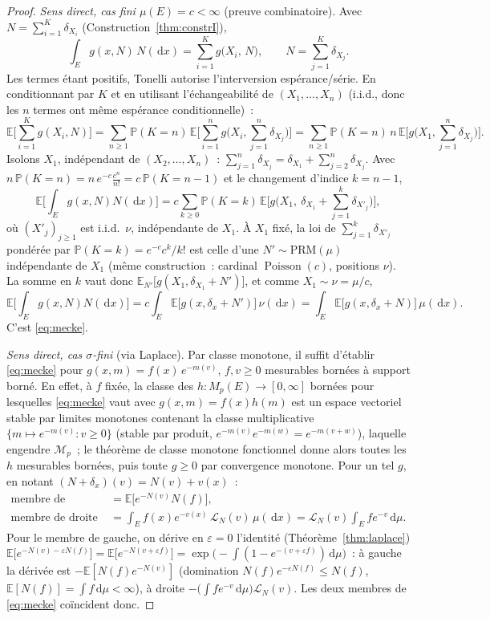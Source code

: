\documentclass[11pt,a4paper]{article}
\theoremstyle{plain}
\theoremstyle{definition}
\newcommand{\E}{\mathbb{E}}
\newcommand{\PP}{\mathbb{P}}
\newcommand{\Poi}{\operatorname{Poisson}}
\newcommand{\Mp}{M_p}
\newcommand{\dd}{\,\mathrm{d}}
\newcommand{\eps}{\varepsilon}
\newcommand{\calM}{\mathcal{M}}
\newcommand{\calL}{\mathcal{L}}
\begin{document}
\begin{proof}
\emph{Sens direct, cas fini $\mu(E)=c<\infty$} (preuve combinatoire). Avec $N=\sum_{i=1}^K\delta_{X_i}$ (Construction~\ref{thm:constrI}),
\[
\int_E g(x,N)\,N(\dd x)=\sum_{i=1}^K g\big(X_i,\,N\big),\qquad N=\sum_{j=1}^K\delta_{X_j}.
\]
Les termes étant positifs, Tonelli autorise l'interversion espérance/série. En conditionnant par $K$ et en utilisant l'échangeabilité de $(X_1,\dots,X_n)$ (i.i.d., donc les $n$ termes ont même espérance conditionnelle)~:
\[
\E\Big[\sum_{i=1}^K g(X_i,N)\Big]
=\sum_{n\ge1}\PP(K=n)\,\E\Big[\sum_{i=1}^n g\big(X_i,\textstyle\sum_{j=1}^n\delta_{X_j}\big)\Big]
=\sum_{n\ge1}\PP(K=n)\,n\,\E\Big[g\big(X_1,\textstyle\sum_{j=1}^n\delta_{X_j}\big)\Big].
\]
Isolons $X_1$, indépendant de $(X_2,\dots,X_n)$~: $\sum_{j=1}^n\delta_{X_j}=\delta_{X_1}+\sum_{j=2}^n\delta_{X_j}$. Avec $n\,\PP(K=n)=n\,e^{-c}\frac{c^n}{n!}=c\,\PP(K=n-1)$ et le changement d'indice $k=n-1$,
\[
\E\Big[\int_E g(x,N)N(\dd x)\Big]
=c\sum_{k\ge0}\PP(K=k)\,\E\Big[g\big(X_1,\ \delta_{X_1}+\textstyle\sum_{j=1}^{k}\delta_{X'_j}\big)\Big],
\]
où $(X'_j)_{j\ge1}$ est i.i.d.\ $\nu$, indépendante de $X_1$. À $X_1$ fixé, la loi de $\sum_{j=1}^{k}\delta_{X'_j}$ pondérée par $\PP(K=k)=e^{-c}c^k/k!$ est celle d'une $N'\sim\mathrm{PRM}(\mu)$ indépendante de $X_1$ (même construction~: cardinal $\Poi(c)$, positions $\nu$). La somme en $k$ vaut donc $\E_{N'}\big[g(X_1,\delta_{X_1}+N')\big]$, et comme $X_1\sim\nu=\mu/c$,
\[
\E\Big[\int_E g(x,N)N(\dd x)\Big]
= c\int_E \E\big[g(x,\delta_x+N')\big]\,\nu(\dd x)
= \int_E \E\big[g(x,\delta_x+N)\big]\,\mu(\dd x).
\]
C'est \eqref{eq:mecke}.

\emph{Sens direct, cas $\sigma$-fini} (via Laplace). Par classe monotone, il suffit d'établir \eqref{eq:mecke} pour $g(x,m)=f(x)\,e^{-m(v)}$, $f,v\ge0$ mesurables bornées à support borné. En effet, à $f$ fixée, la classe des $h:\Mp(E)\to[0,\infty]$ bornées pour lesquelles \eqref{eq:mecke} vaut avec $g(x,m)=f(x)h(m)$ est un espace vectoriel stable par limites monotones contenant la classe multiplicative $\{m\mapsto e^{-m(v)}:v\ge0\}$ (stable par produit, $e^{-m(v)}e^{-m(w)}=e^{-m(v+w)}$), laquelle engendre $\calM_p$~; le théorème de classe monotone fonctionnel donne alors toutes les $h$ mesurables bornées, puis toute $g\ge0$ par convergence monotone. Pour un tel $g$, en notant $(N+\delta_x)(v)=N(v)+v(x)$~:
\begin{align*}
\text{membre de gauche}&=\E\big[e^{-N(v)}N(f)\big],\\
\text{membre de droite}&=\int_E f(x)e^{-v(x)}\,\calL_N(v)\,\mu(\dd x)=\calL_N(v)\!\int_E\! f e^{-v}\dd\mu.
\end{align*}
Pour le membre de gauche, on dérive en $\eps=0$ l'identité (Théorème~\ref{thm:laplace}) $\E\big[e^{-N(v)-\eps N(f)}\big]=\E\big[e^{-N(v+\eps f)}\big]=\exp\!\big(-\int(1-e^{-(v+\eps f)})\dd\mu\big)$~: à gauche la dérivée est $-\E[N(f)e^{-N(v)}]$ (domination $N(f)e^{-\eps N(f)}\le N(f)$, $\E[N(f)]=\int f\dd\mu<\infty$), à droite $-\big(\int f e^{-v}\dd\mu\big)\calL_N(v)$. Les deux membres de \eqref{eq:mecke} coïncident donc.


\end{proof}
\end{document}
